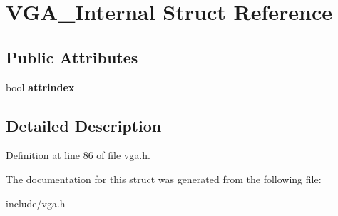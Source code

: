\hypertarget{structVGA__Internal}{\section{V\-G\-A\-\_\-\-Internal Struct Reference}
\label{structVGA__Internal}
}
\subsection*{Public Attributes}
\begin{DoxyCompactItemize}
\item 
\hypertarget{structVGA__Internal_a36feb3e3abbf2c0f50f3fbe45ad763aa}{bool {\bfseries attrindex}}\label{structVGA__Internal_a36feb3e3abbf2c0f50f3fbe45ad763aa}

\end{DoxyCompactItemize}


\subsection{Detailed Description}


Definition at line 86 of file vga.\-h.



The documentation for this struct was generated from the following file\-:\begin{DoxyCompactItemize}
\item 
include/vga.\-h\end{DoxyCompactItemize}
